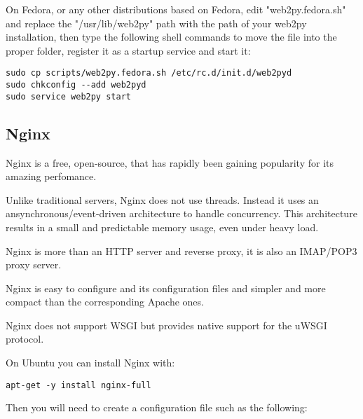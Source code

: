 \documentclass[justified,sixbynine,notoc]{tufte-book}
\def\inxx#1{\index{#1}}
\begin{document}
\begin{fullwidth}
On Fedora, or any other distributions based on Fedora, edit "web2py.fedora.sh" and replace the "/usr/lib/web2py" path with the path of your web2py installation, then type the following shell commands to move the file into the proper folder, register it as a startup service and start it:
\begin{lstlisting}
sudo cp scripts/web2py.fedora.sh /etc/rc.d/init.d/web2pyd
sudo chkconfig --add web2pyd
sudo service web2py start
\end{lstlisting}

\goodbreak\subsection{Nginx}

Nginx is a free, open-source, that has rapidly been gaining popularity for its amazing perfomance.

Unlike traditional servers, Nginx does not use threads. Instead it uses an ansynchronous/event-driven architecture to handle concurrency. This architecture results in a small and predictable memory usage, even under heavy load.

Nginx is more than an HTTP server and reverse proxy, it is also an IMAP/POP3 proxy server.

Nginx is easy to configure and its configuration files and simpler and more compact than the corresponding Apache ones.

Nginx does not support WSGI but provides native support for the uWSGI~\cite{uwsgi} protocol.\inxx{uwsgi}

On Ubuntu you can install Nginx with:
\begin{lstlisting}
apt-get -y install nginx-full
\end{lstlisting}

Then you will need to create a configuration file such as the following:


\end{fullwidth}
\end{document}
